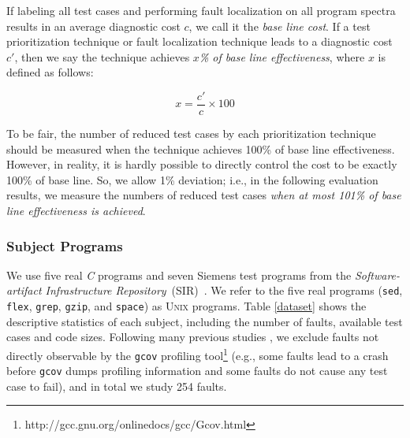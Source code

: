 If labeling all test cases and performing fault localization on all program spectra results in an average diagnostic cost $c$, we call it the {\em base line cost}. If a test prioritization technique or fault localization technique leads to a diagnostic cost $c'$, then we say the technique achieves {\em $x$\% of base line effectiveness}, where $x$ is defined as follows:

\begin{equation}\label{equation.baselinecost}
	x = \frac{c'}{c} \times 100
\end{equation}

To be fair, the number of reduced test cases by each prioritization technique should be measured when the technique achieves 100\% of base line effectiveness. However, in reality, it is hardly possible to directly control the cost to be exactly 100\% of base line. So, we allow 1\% deviation; i.e., in the following evaluation results, we measure the numbers of reduced test cases {\em when at most 101\% of base line effectiveness is achieved}.


\subsubsection{Subject Programs}\label{sec.exp.subject}

We use five real {\em C} programs and seven Siemens test programs from the
{\em Software-artifact Infrastructure Repository}~(SIR)~\citep{doESE05}. We refer to the five real programs (\texttt{sed}, \texttt{flex}, \texttt{grep}, \texttt{gzip}, and \texttt{space}) as \textsc{Unix} programs. Table \ref{dataset} shows the descriptive statistics of each subject,
including the number of faults, available test cases and code sizes. Following many previous studies \citep[e.g.][]{JHS02,Abreu:2009.jss}, we exclude faults not directly observable by the {\tt gcov} profiling
tool\footnote{http://gcc.gnu.org/onlinedocs/gcc/Gcov.html} (e.g., some faults lead to a crash before \texttt{gcov} dumps profiling information and some faults do not cause any test case to fail), and in total we study 254 faults.

